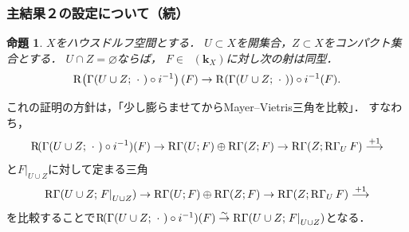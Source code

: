 \documentclass[dvipdfmx,10pt,aspectratio=169,leqno]{beamer}%
\newcommand{\kk}{\mathbf{k}}
\numberwithin{equation}{subsection}
\newcommand{\Dompl}{\mathop{\mathsf{D}^\mathrm{+}}\nolimits}
\newcommand{\RG}{\mathop{\mathrm{R}\hspace{-0pt}\Gamma}\nolimits}
\newcommand{\Rder}[1][]{\mathop{\mathrm{R}^{#1}\hspace{-2pt}}\nolimits}
\newcommand{\simar}{\mathrel{\overset{\sim}{\rightarrow}}}%
\newcommand{\blk}{\mathord{\ \cdot\ }}
\newcommand{\mres}[2][]{{\left.{#1}\right\rvert}_{#2}}
\theoremstyle{mystyle}
\newtheorem{PRP}[AXM]{命題}
\begin{document}
\begin{frame}
  \frametitle{主結果２の設定について（続）}
  \begin{PRP}
    \(X\)をハウスドルフ空間とする．
    \(U\subset X\)を開集合，\(Z\subset X\)をコンパクト集合とする．
    \(U\cap Z=\varnothing\)ならば，
    \(F\in\Dompl(\kk_{X})\)に対し次の射は同型．\[
      \Rder[]\left(\Gamma(U\cup Z;\blk)\circ i^{-1}\right)(F)
      \to
      \Rder[]{(\Gamma(U\cup Z;\blk))}\circ i^{-1}(F).
    \]
  \end{PRP}
  これの証明の方針は，「少し膨らませてからMayer--Vietris三角を比較」．
  すなわち，
  \[
    \Rder(\Gamma(U\cup Z;\blk)\circ i^{-1})(F)
    \to \RG(U;F)\oplus\RG(Z;F)
    \to \RG(Z;\RG_{U}F)
    \overset{+1}{\longrightarrow}
  \]
  と\(\mres[F]{U\cup Z}\)に対して定まる三角
  \[
    \RG(U\cup Z;\mres[F]{U\cup Z})
    \to \RG(U;F)\oplus\RG(Z;F)
    \to \RG(Z;\RG_{U}F)
    \overset{+1}{\longrightarrow}
  \]を比較することで\(
    \Rder(\Gamma(U\cup Z;\blk)\circ i^{-1})(F)
    \simar
    \RG(U\cup Z;\mres[F]{U\cup Z})
  \)となる．
\end{frame}

\end{document}

